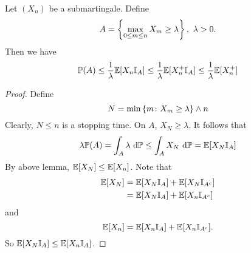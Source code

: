 \begin{thm}
    Let $(X_n)$ be a submartingale. Define
    \begin{equation*}
        A = \left\{\max_{0 \leq m \leq n} X_m \geq \lambda\right\},~\lambda > 0.
    \end{equation*}
    Then we have
    \begin{equation*}
        \mathbb{P}(A) \leq \frac{1}{\lambda} \mathbb{E}[X_n\mathbb{I}_A] \leq \frac{1}{\lambda} \mathbb{E}[X_n^+\mathbb{I}_A] \leq \frac{1}{\lambda} \mathbb{E}[X_n^+]
    \end{equation*}
\end{thm}
\begin{proof}
    Define
    \begin{equation*}
        N = \min \left\{m \colon X_m \geq \lambda\right\} \wedge n
    \end{equation*}
    Clearly, $N \leq n$ is a stopping time. On $A$, $X_N \geq \lambda$. It follows that
    \begin{equation*}
        \lambda \mathbb{P}(A) = \int_A \lambda ~\mathrm{d}\mathbb{P} \leq \int_A X_N ~\mathrm{d}\mathbb{P} = \mathbb{E}[X_N\mathbb{I}_A]
    \end{equation*}
    By above lemma, $\mathbb{E}[X_N] \leq \mathbb{E}[X_n]$. Note that
    \begin{equation*}
        \begin{aligned}
            \mathbb{E}[X_N] &= \mathbb{E}[X_N\mathbb{I}_A] + \mathbb{E}[X_N\mathbb{I}_{A^c}] \\
            &= \mathbb{E}[X_N\mathbb{I}_A] + \mathbb{E}[X_n\mathbb{I}_{A^c}]
        \end{aligned}
    \end{equation*}
    and
    \begin{equation*}
        \mathbb{E}[X_n] = \mathbb{E}[X_n\mathbb{I}_A] + \mathbb{E}[X_n\mathbb{I}_{A^c}].
    \end{equation*}
    So $\mathbb{E}[X_N\mathbb{I}_A] \leq \mathbb{E}[X_n\mathbb{I}_A]$.
\end{proof}

